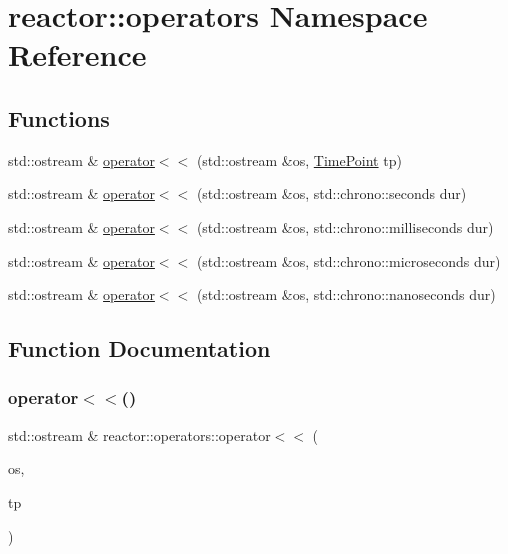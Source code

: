 \hypertarget{namespacereactor_1_1operators}{}\section{reactor\+:\+:operators Namespace Reference}
\label{namespacereactor_1_1operators}
\subsection*{Functions}
\begin{DoxyCompactItemize}
\item 
std\+::ostream \& \hyperlink{namespacereactor_1_1operators_a8ea55f33a5ed641face930e457c1f997}{operator$<$$<$} (std\+::ostream \&os, \hyperlink{namespacereactor_ad950f8d1a46612500286a4af0f167080}{Time\+Point} tp)
\item 
std\+::ostream \& \hyperlink{namespacereactor_1_1operators_aac16dca80170efe903081b2b41cfda47}{operator$<$$<$} (std\+::ostream \&os, std\+::chrono\+::seconds dur)
\item 
std\+::ostream \& \hyperlink{namespacereactor_1_1operators_a7bc089730a721df6047cd010af2501d2}{operator$<$$<$} (std\+::ostream \&os, std\+::chrono\+::milliseconds dur)
\item 
std\+::ostream \& \hyperlink{namespacereactor_1_1operators_a279ac480746dbb8a6dcd71179df68032}{operator$<$$<$} (std\+::ostream \&os, std\+::chrono\+::microseconds dur)
\item 
std\+::ostream \& \hyperlink{namespacereactor_1_1operators_ac12faa5aad6eda9a53865201264ea257}{operator$<$$<$} (std\+::ostream \&os, std\+::chrono\+::nanoseconds dur)
\end{DoxyCompactItemize}


\subsection{Function Documentation}
\mbox{\label{namespacereactor_1_1operators_a8ea55f33a5ed641face930e457c1f997}} 
\subsubsection{\texorpdfstring{operator$<$$<$()}{operator<<()}\hspace{0.1cm}{\footnotesize\ttfamily [1/5]}}
{\footnotesize\ttfamily std\+::ostream \& reactor\+::operators\+::operator$<$$<$ (\begin{DoxyParamCaption}\item[{std\+::ostream \&}]{os,  }\item[{\hyperlink{namespacereactor_ad950f8d1a46612500286a4af0f167080}{Time\+Point}}]{tp }\end{DoxyParamCaption})}

